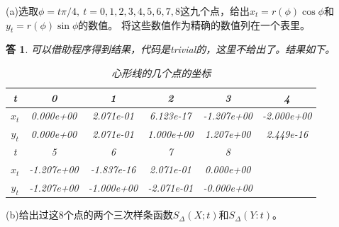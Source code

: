 \documentclass[10pt]{ctexart}
\newtheorem*{answer}{答}
\begin{document}
(a)选取$\phi=t\pi/4,\ t=0,1,2,3,4,5,6,7,8$这九个点，给出$x_t=r(\phi)\cos{\phi}$和$y_t=r(\phi)\sin{\phi}$的数值。
将这些数值作为精确的数值列在一个表里。
\begin{answer}
    可以借助程序得到结果，代码是trivial的，这里不给出了。结果如下。
    \begin{table}[H]
        \centering
        \begin{tabular}{cccccc}
            \toprule
            t & 0 & 1 & 2 & 3 & 4 \\
            \midrule
            $x_t$ & 0.000e+00 & 2.071e-01 & 6.123e-17 & -1.207e+00 & -2.000e+00\\
            $y_t$ & 0.000e+00 & 2.071e-01 & 1.000e+00 & 1.207e+00 & 2.449e-16\\
            \bottomrule
            \toprule
            t & 5 & 6 & 7 & 8 &  \\
            \midrule
            $x_t$ & -1.207e+00 & -1.837e-16 & 2.071e-01 & 0.000e+00 &\\
            $y_t$ & -1.207e+00 & -1.000e+00 & -2.071e-01 & -0.000e+00 &\\
            \bottomrule
        \end{tabular}
        \caption{心形线的几个点的坐标}
    \end{table}
\end{answer}
(b)给出过这8个点的两个三次样条函数$S_{\Delta}(X;t)$和$S_{\Delta}(Y:t)$。
\end{document}
